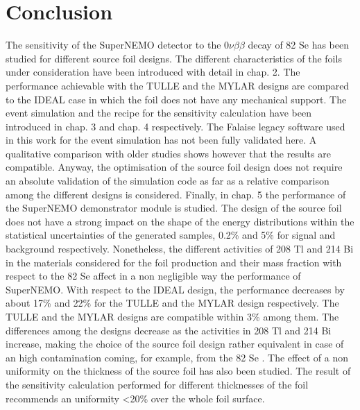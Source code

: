 \documentclass[main.tex]{subfiles}
\begin{document}
\section{Conclusion}\label{sec:SourceFoilDesignConclusion}


\NI The sensitivity of the SuperNEMO detector to the 0$\nu\beta\beta$ decay of 82 Se has been studied for different source foil designs. The different characteristics of the foils under consideration have been introduced with detail in chap. 2. The performance achievable with the TULLE and the MYLAR designs are compared to the IDEAL case in which the foil does not have any mechanical support. The event simulation and the recipe for the sensitivity calculation have been introduced in chap. 3 and chap. 4 respectively. The Falaise legacy software used in this work for the event simulation has not been fully validated here. A qualitative comparison with older studies shows however that the results are compatible. Anyway, the optimisation of the source foil design does not require an absolute validation of the simulation code as far as a relative comparison among the different designs is considered. Finally, in chap. 5 the performance of the SuperNEMO demonstrator module is studied. The design of the source foil does not have a strong impact on the shape of the energy distributions within the statistical uncertainties of the generated samples, 0.2\% and 5\% for signal and background respectively. Nonetheless, the different activities of 208 Tl and 214 Bi in the materials considered for the foil production and their mass fraction with respect to the 82 Se affect in a non negligible way the performance of SuperNEMO. With respect to the IDEAL design, the performance decreases by about 17\% and 22\% for the TULLE and the MYLAR design respectively. The TULLE and the MYLAR designs are compatible within 3\% among them. The differences among the designs decrease as the activities in 208 Tl and 214 Bi increase, making the choice of the source foil design rather equivalent in case of an high contamination coming, for example, from the 82 Se . The effect of a non uniformity on the thickness of the source foil has also been studied. The result of the sensitivity calculation performed for different thicknesses of the foil recommends an uniformity <20\% over the whole foil surface.
\end{document}

